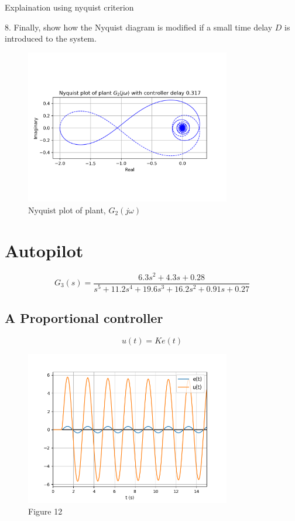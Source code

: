 \documentclass[8pt]{article}
\begin{document}
Explaination using nyquist criterion

8. Finally, show how the Nyquist diagram is modified if a small time delay $D$ is introduced to the system.
\begin{figure}[H]
    \centering
    \includegraphics[width=0.8\textwidth]{figures/nyquist3.png}
    \caption{Nyquist plot of plant, $G_2(j\omega)$}
    \label{fig:nyquist3}
\end{figure}

\section{Autopilot}

\begin{equation}
    G_3(s) = \frac{6.3s^2 + 4.3s + 0.28}{s^5 + 11.2s^4 + 19.6s^3 + 16.2s^2 + 0.91s + 0.27}
\end{equation}

\subsection{A Proportional controller}

\begin{equation}
    u(t) = Ke(t)
\end{equation}

\begin{figure}[H]
    \centering
    \includegraphics[width=0.8\textwidth]{figures/FIGURE_12.png}
    \caption{Figure 12}
    \label{fig:figure12}
\end{figure}
\end{document}
